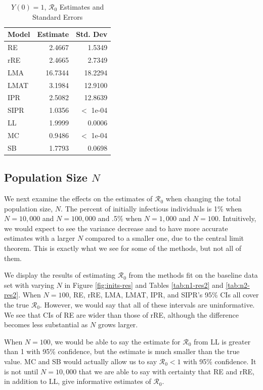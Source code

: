 \documentclass[12pt]{article}
\newcommand{\rr}{\ensuremath{\mathcal{R}_0}}
\begin{document}
\begin{table}[H]
	
	\centering
	\begin{tabular}[t]{l|r|r}
		\hline
		Model & Estimate & Std. Dev\\
		\hline
		RE & 2.4667 & 1.5349\\
		\hline
		rRE & 2.4665 & 2.7349\\
		\hline
		LMA & 16.7344 & 18.2294\\
		\hline
		LMAT & 3.1984 & 12.9100\\
		\hline
		IPR & 2.5082 & 12.8639\\
		\hline
		SIPR & 1.0356 & $<$ 1e-04\\
		\hline
		LL & 1.9999 & 0.0006\\
		\hline
		MC & 0.9486 & $<$ 1e-04\\
		\hline
		SB & 1.7793 & 0.0698\\
		\hline
	\end{tabular}
	\caption{$Y(0) = 1$, $\rr$ Estimates and Standard Errors}
\end{table}


\subsection{Population Size $N$}\label{sec:res-n}
We next examine the effects on the estimates of $\rr$ when changing the total population size, $N$.  The percent of initially infectious individuals is 1\% when $N=10,000$ and $N=100,000$ and .5\% when $N=1,000$ and $N=100$. Intuitively, we would expect to see the variance decrease and to have more accurate estimates with a larger $N$ compared to a smaller one, due to the central limit theorem.  This is exactly what we see for some of the methods, but not all of them.

We display the results of estimating $\rr$ from the methods fit on the baseline data set with varying $N$ in Figure \ref{fig:inits-res} and Tables \ref{tab:n1-res2} and \ref{tab:n2-res2}.  When $N=100$, RE, rRE, LMA, LMAT, IPR, and SIPR's 95\% CIs all cover the true $\rr$.  However, we would say that all of these intervals are uninformative.  We see that CIs of RE are wider than those of rRE, although the difference becomes less substantial as $N$ grows larger.

When $N=100$, we would be able to say the estimate for $\rr$ from LL is greater than 1 with 95\% confidence, but the estimate is much smaller than the true value.  MC and SB would actually allow us to say $\rr < 1$ with 95\% confidence.  It is not until $N=10,000$ that we are able to say with certainty that RE and rRE, in addition to LL, give informative estimates of $\rr$.
\end{document}
